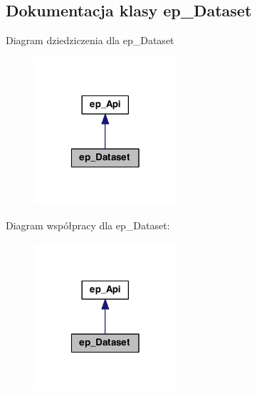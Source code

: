 \hypertarget{classep___dataset}{\subsection{Dokumentacja klasy ep\-\_\-\-Dataset}
\label{classep___dataset}
}


Diagram dziedziczenia dla ep\-\_\-\-Dataset\nopagebreak
\begin{figure}[H]
\begin{center}
\leavevmode
\includegraphics[width=150pt]{classep___dataset__inherit__graph}
\end{center}
\end{figure}


Diagram współpracy dla ep\-\_\-\-Dataset\-:\nopagebreak
\begin{figure}[H]
\begin{center}
\leavevmode
\includegraphics[width=150pt]{classep___dataset__coll__graph}
\end{center}
\end{figure}
